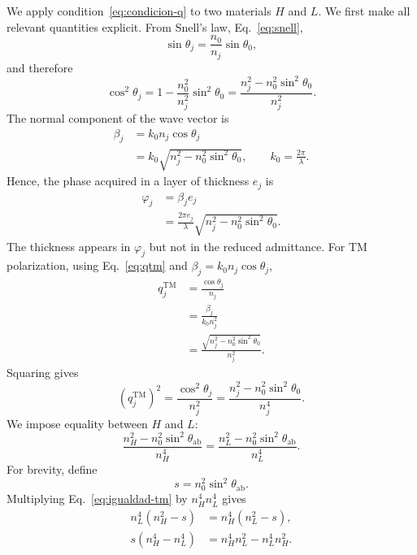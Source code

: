 \documentclass[10pt,a4paper]{article}
\begin{document}
We apply condition~\eqref{eq:condicion-q} to two materials $H$ and $L$. We first make all relevant quantities explicit. From Snell's law, Eq.~\eqref{eq:snell},
\begin{equation}
\sin\theta_j=\frac{n_0}{n_j}\sin\theta_0,
\end{equation}
and therefore
\begin{equation}
\cos^2\theta_j
=1-\frac{n_0^2}{n_j^2}\sin^2\theta_0
=\frac{n_j^2-n_0^2\sin^2\theta_0}{n_j^2}.
\label{eq:cos2}
\end{equation}
The normal component of the wave vector is
\begin{align}
\beta_j
&=k_0n_j\cos\theta_j
\nonumber\\
&=k_0\sqrt{n_j^2-n_0^2\sin^2\theta_0},
\qquad
k_0=\frac{2\pi}{\lambda}.
\label{eq:beta-seccion-tm}
\end{align}
Hence, the phase acquired in a layer of thickness $e_j$ is
\begin{align}
\varphi_j
&=\beta_j e_j
\nonumber\\
&=\frac{2\pi e_j}{\lambda}
\sqrt{n_j^2-n_0^2\sin^2\theta_0}.
\label{eq:phi-explicita-tm}
\end{align}
The thickness appears in $\varphi_j$ but not in the reduced admittance. For TM polarization, using Eq.~\eqref{eq:qtm} and $\beta_j=k_0n_j\cos\theta_j$,
\begin{align}
q_j^{\mathrm{TM}}
&=\frac{\cos\theta_j}{n_j}
\nonumber\\
&=\frac{\beta_j}{k_0n_j^2}
\nonumber\\
&=\frac{\sqrt{n_j^2-n_0^2\sin^2\theta_0}}{n_j^2}.
\label{eq:qtm-beta}
\end{align}
Squaring gives
\begin{equation}
\left(q_j^{\mathrm{TM}}\right)^2
=\frac{\cos^2\theta_j}{n_j^2}
=\frac{n_j^2-n_0^2\sin^2\theta_0}{n_j^4}.
\label{eq:qtm2}
\end{equation}
We impose equality between $H$ and $L$:
\begin{equation}
\frac{n_H^2-n_0^2\sin^2\theta_{\mathrm{ab}}}{n_H^4}
=
\frac{n_L^2-n_0^2\sin^2\theta_{\mathrm{ab}}}{n_L^4}.
\label{eq:igualdad-tm}
\end{equation}
For brevity, define
\begin{equation}
s=n_0^2\sin^2\theta_{\mathrm{ab}}.
\end{equation}
Multiplying Eq.~\eqref{eq:igualdad-tm} by $n_H^4n_L^4$ gives
\begin{align}
n_L^4(n_H^2-s)&=n_H^4(n_L^2-s),\\
s(n_H^4-n_L^4)&=n_H^4n_L^2-n_L^4n_H^2.
\end{align}
\end{document}

